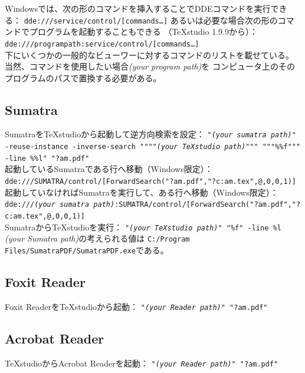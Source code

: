 Windowsでは、次の形のコマンドを挿入することでDDEコマンドを実行できる：
\texttt{dde:///service/control/{[}commands\ldots{}{]}}
あるいは必要な場合次の形のコマンドでプログラムを起動することもできる
（TeXstudio 1.9.9から）：
\texttt{dde:///programpath:service/control/{[}commands\ldots{}{]}}\\


下にいくつかの一般的なビューワーに対するコマンドのリストを載せている。
当然、コマンドを使用したい場合\emph{(your program path)}を
コンピュータ上のそのプログラムのパスで置換する必要がある。

\subsection{Sumatra}

SumatraをTeXstudioから起動して逆方向検索を設定：
\texttt{"\emph{(your sumatra path)}" -reuse-instance -inverse-search
 """"\emph{(your TeXstudio path)}""" """\%\%f""" -line \%\%l" "?am.pdf"}\\


起動しているSumatraである行へ移動（Windows限定）：\\
\texttt{dde:///SUMATRA/control/{[}ForwardSearch("?am.pdf","?c:am.tex",@,0,0,1){]}}\\


起動していなければSumatraを実行して、ある行へ移動（Windows限定）：
\texttt{dde:///\emph{(your sumatra path)}:SUMATRA/control/{[}ForwardSearch("?am.pdf","?c:am.tex",@,0,0,1){]}}\\


SumatraからTeXstudioを実行： \texttt{"\emph{(your TeXstudio path)}" "\%f" -line \%l}\\


\emph{(your Sumatra path)}の考えられる値は
\verb+C:/Program Files/SumatraPDF/SumatraPDF.exe+である。

\subsection{Foxit Reader}

Foxit ReaderをTeXstudioから起動：
 \texttt{"\emph{(your Reader path)"} "?am.pdf"}

\subsection{Acrobat Reader}

TeXstudioからAcrobat Readerを起動：
 \texttt{"\emph{(your Reader path)"} "?am.pdf"}\\


